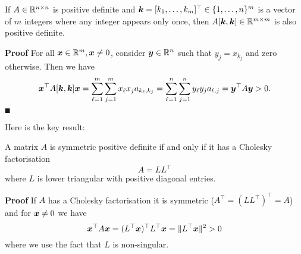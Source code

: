 \begin{theorem} If $A \in {\mathbb R}^{n \times n}$ is positive definite and $\bm{{\mbox{\boldmath$k$\unboldmath}}} = [k_1,\ldots,k_m]^\top \in \{1,\ldots,n\}^m$ is a vector of $m$ integers where any integer appears only once,  then $A[\bm{{\mbox{\boldmath$k$\unboldmath}}},\bm{{\mbox{\boldmath$k$\unboldmath}}}] \in {\mathbb R}^{m \times m}$ is also positive definite. \end{theorem}
\textbf{Proof} For all $\bm{{\mbox{\boldmath$x$\unboldmath}}} \in {\mathbb R}^m, \bm{{\mbox{\boldmath$x$\unboldmath}}} \neq 0$, consider $\bm{{\mbox{\boldmath$y$\unboldmath}}} \in {\mathbb R}^n$ such that $y_j = x_{k_j}$ and zero otherwise. Then we have
\[
\bm{{\mbox{\boldmath$x$\unboldmath}}}^\top A[\bm{{\mbox{\boldmath$k$\unboldmath}}},\bm{{\mbox{\boldmath$k$\unboldmath}}}] \bm{{\mbox{\boldmath$x$\unboldmath}}} = \sum_{\ell=1}^m \sum_{j=1}^m x_\ell x_j a_{k_\ell,k_j}  = \sum_{\ell=1}^n \sum_{j=1}^n y_\ell y_j a_{\ell,j} = \bm{{\mbox{\boldmath$y$\unboldmath}}}^\top A \bm{{\mbox{\boldmath$y$\unboldmath}}} > 0.
\]
\ensuremath{\QED}

Here is the key result:

\begin{theorem} A matrix $A$ is symmetric positive definite if and only if it has a Cholesky factorisation
\[
A = L L^\ensuremath{\top}
\]
where $L$ is lower triangular with positive diagonal entries.

\end{theorem}
\textbf{Proof} If $A$ has a Cholesky factorisation it is symmetric ($A^\ensuremath{\top} = (L L^\ensuremath{\top})^\ensuremath{\top} = A$) and for $\bm{{\mbox{\boldmath$x$\unboldmath}}} \neq 0$ we have
\[
\bm{{\mbox{\boldmath$x$\unboldmath}}}^\top A \bm{{\mbox{\boldmath$x$\unboldmath}}} = (L^\top\bm{{\mbox{\boldmath$x$\unboldmath}}})^\top L^\top \bm{{\mbox{\boldmath$x$\unboldmath}}} = \|L^\top\bm{{\mbox{\boldmath$x$\unboldmath}}}\|^2 > 0
\]
where we use the fact that $L$ is non-singular.

